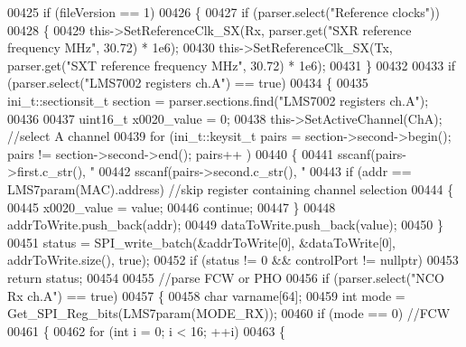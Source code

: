 \begin{DoxyCode}
{{00425     \textcolor{keywordflow}{if} (fileVersion == 1)
00426     \{
00427         \textcolor{keywordflow}{if} (parser.select(\textcolor{stringliteral}{"Reference clocks"}))
00428         \{
00429             this->SetReferenceClk_SX(Rx, parser.get(\textcolor{stringliteral}{"SXR reference frequency MHz"}, 30.72) * 1e6);
00430             this->SetReferenceClk_SX(Tx, parser.get(\textcolor{stringliteral}{"SXT reference frequency MHz"}, 30.72) * 1e6);
00431         \}
00432 
00433         \textcolor{keywordflow}{if} (parser.select(\textcolor{stringliteral}{"LMS7002 registers ch.A"}) == \textcolor{keyword}{true})
00434         \{
00435             ini\_t::sectionsit\_t section = parser.sections.find(\textcolor{stringliteral}{"LMS7002 registers ch.A"});
00436 
00437             uint16\_t x0020\_value = 0;
00438             this->SetActiveChannel(ChA); \textcolor{comment}{//select A channel}
00439             \textcolor{keywordflow}{for} (ini\_t::keysit\_t pairs = section->second->begin(); pairs != section->second->end(); pairs++
      )
00440             \{
00441                 sscanf(pairs->first.c\_str(), \textcolor{stringliteral}{"%
00442                 sscanf(pairs->second.c\_str(), \textcolor{stringliteral}{"%
00443                 \textcolor{keywordflow}{if} (addr == LMS7param(MAC).address) \textcolor{comment}{//skip register containing channel selection}
00444                 \{
00445                     x0020\_value = value;
00446                     \textcolor{keywordflow}{continue};
00447                 \}
00448                 addrToWrite.push\_back(addr);
00449                 dataToWrite.push\_back(value);
00450             \}
00451             status = SPI_write_batch(&addrToWrite[0], &dataToWrite[0], addrToWrite.size(), \textcolor{keyword}{true});
00452             \textcolor{keywordflow}{if} (status != 0 && controlPort != \textcolor{keyword}{nullptr})
00453                 \textcolor{keywordflow}{return} status;
00454 
00455             \textcolor{comment}{//parse FCW or PHO}
00456             \textcolor{keywordflow}{if} (parser.select(\textcolor{stringliteral}{"NCO Rx ch.A"}) == \textcolor{keyword}{true})
00457             \{
00458                 \textcolor{keywordtype}{char} varname[64];
00459                 \textcolor{keywordtype}{int} mode = Get_SPI_Reg_bits(LMS7param(MODE_RX));
00460                 \textcolor{keywordflow}{if} (mode == 0) \textcolor{comment}{//FCW}
00461                 \{
00462                     \textcolor{keywordflow}{for} (\textcolor{keywordtype}{int} i = 0; i < 16; ++i)
00463                     \{
}}}}
\end{DoxyCode}
